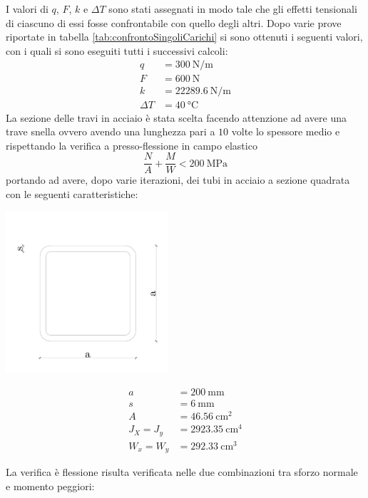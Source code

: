 I valori di $q$, $F$, $k$ e $\Delta T$ sono stati assegnati in modo tale che gli effetti  tensionali di ciascuno di essi fosse confrontabile con quello degli altri. 
Dopo varie prove riportate in tabella \ref{tab:confrontoSingoliCarichi} si sono ottenuti i seguenti valori, con i quali si sono eseguiti tutti i successivi calcoli:
\begin{align*}
	q &= \SI{300}{\newton \per \metre}\\
	F &= \SI{600}{\newton}\\
	k &= \SI{22289.6}{\newton \per \metre}\\
	\Delta T &= \SI{40}{\celsius}
\end{align*}
La sezione delle travi in acciaio è stata scelta facendo attenzione ad avere una trave snella ovvero avendo una lunghezza pari a $10$ volte lo spessore medio e rispettando la verifica a presso-flessione in campo elastico 
\[
\frac{N}{A} + \frac{M}{W} < \SI{200}{\mega\pascal}
\]
portando ad avere, dopo varie iterazioni, dei tubi in acciaio a sezione quadrata con le seguenti caratteristiche:
\begin{center}
\begin{minipage}{6cm}
	\includegraphics[width=60mm]{rel1/img1/tubi-quadri.pdf}
\end{minipage}
\begin{minipage}{6cm}
	\begin{align*}
		a &= \SI{200}{\milli\metre}\\
		s &= \SI{6}{\milli\metre}\\
		A &= \SI{46.56}{\centi\metre\squared}\\
		J_X = J_y &= \SI{2923.35}{\centi\metre\tothe{4}}\\
		W_x = W_y &= \SI{292.33}{\centi\metre\cubed}
	\end{align*}
\end{minipage}
\end{center}
La verifica è flessione risulta verificata nelle due combinazioni tra sforzo normale e momento peggiori: 
